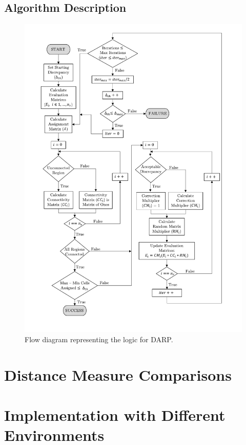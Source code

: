 \subsection{Algorithm Description}
\begin{figure}[h!]
	\centering
	\includegraphics[scale=0.8,trim={1.5cm 0 1.5cm 0},clip]{figs/DARP_Diagram3.pdf}
	\caption{Flow diagram representing the logic for DARP.}
	\label{fig:DARP}
\end{figure}

\section{Distance Measure Comparisons}

\section{Implementation with Different Environments}